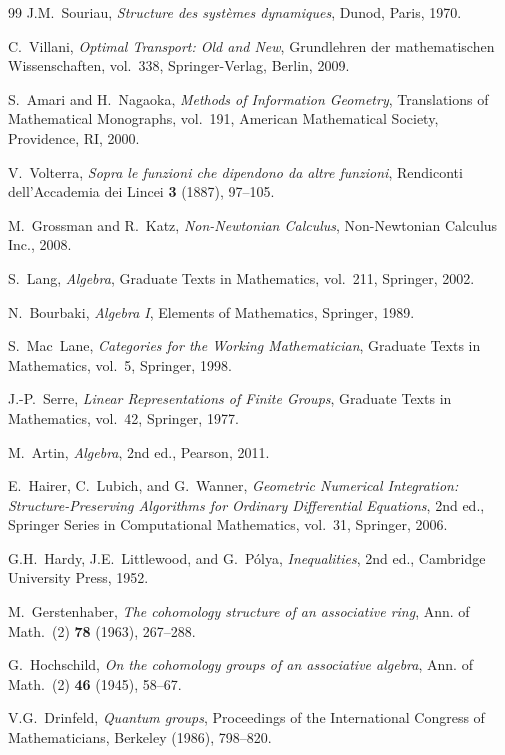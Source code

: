 \documentclass[11pt,a4paper,openany]{book}
\theoremstyle{plain}
\theoremstyle{definition}
\begin{document}
\begin{thebibliography}{99}
J.M.~Souriau, \emph{Structure des syst\`emes dynamiques}, Dunod, Paris, 1970.

C.~Villani, \emph{Optimal Transport: Old and New}, Grundlehren der mathematischen Wissenschaften, vol.~338, Springer-Verlag, Berlin, 2009.

S.~Amari and H.~Nagaoka, \emph{Methods of Information Geometry}, Translations of Mathematical Monographs, vol.~191, American Mathematical Society, Providence, RI, 2000.

V.~Volterra, \emph{Sopra le funzioni che dipendono da altre funzioni}, Rendiconti dell'Accademia dei Lincei \textbf{3} (1887), 97--105.

M.~Grossman and R.~Katz, \emph{Non-Newtonian Calculus}, Non-Newtonian Calculus Inc., 2008.

S.~Lang, \emph{Algebra}, Graduate Texts in Mathematics, vol.~211, Springer, 2002.

N.~Bourbaki, \emph{Algebra I}, Elements of Mathematics, Springer, 1989.

S.~Mac~Lane, \emph{Categories for the Working Mathematician}, Graduate Texts in Mathematics, vol.~5, Springer, 1998.

J.-P.~Serre, \emph{Linear Representations of Finite Groups}, Graduate Texts in Mathematics, vol.~42, Springer, 1977.

M.~Artin, \emph{Algebra}, 2nd ed., Pearson, 2011.

E.~Hairer, C.~Lubich, and G.~Wanner, \emph{Geometric Numerical Integration: Structure-Preserving Algorithms for Ordinary Differential Equations}, 2nd ed., Springer Series in Computational Mathematics, vol.~31, Springer, 2006.

G.H.~Hardy, J.E.~Littlewood, and G.~P\'olya, \emph{Inequalities}, 2nd ed., Cambridge University Press, 1952.

M.~Gerstenhaber, \emph{The cohomology structure of an associative ring}, Ann. of Math.\ (2) \textbf{78} (1963), 267--288.

G.~Hochschild, \emph{On the cohomology groups of an associative algebra}, Ann. of Math.\ (2) \textbf{46} (1945), 58--67.

V.G.~Drinfeld, \emph{Quantum groups}, Proceedings of the International Congress of Mathematicians, Berkeley (1986), 798--820.


\end{thebibliography}
\end{document}
